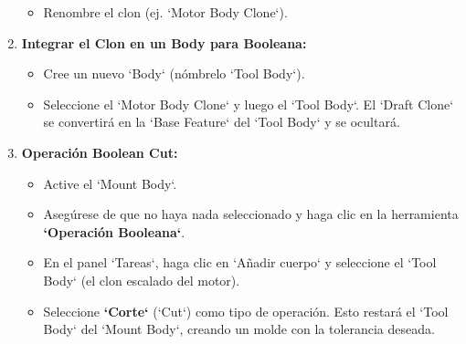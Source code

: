 \documentclass[12pt]{article}
\begin{document}
\begin{enumerate}[label=\arabic*)]
\begin{itemize}[label=\textendash]
        \item Renombre el clon (ej. `Motor Body Clone`).
    \end{itemize}
    \item \textbf{Integrar el Clon en un Body para Booleana:}
    \begin{itemize}[label=\textendash]
        \item Cree un nuevo `Body` (nómbrelo `Tool Body`).
        \item Seleccione el `Motor Body Clone` y luego el `Tool Body`. El `Draft Clone` se convertirá en la `Base Feature` del `Tool Body` y se ocultará.
    \end{itemize}
    \item \textbf{Operación Boolean Cut:}
    \begin{itemize}[label=\textendash]
        \item Active el `Mount Body`.
        \item Asegúrese de que no haya nada seleccionado y haga clic en la herramienta \textbf{`Operación Booleana`}.
        \item En el panel `Tareas`, haga clic en `Añadir cuerpo` y seleccione el `Tool Body` (el clon escalado del motor).
        \item Seleccione \textbf{`Corte`} (`Cut`) como tipo de operación. Esto restará el `Tool Body` del `Mount Body`, creando un molde con la tolerancia deseada.
    \end{itemize}
\end{enumerate}
\end{document}
